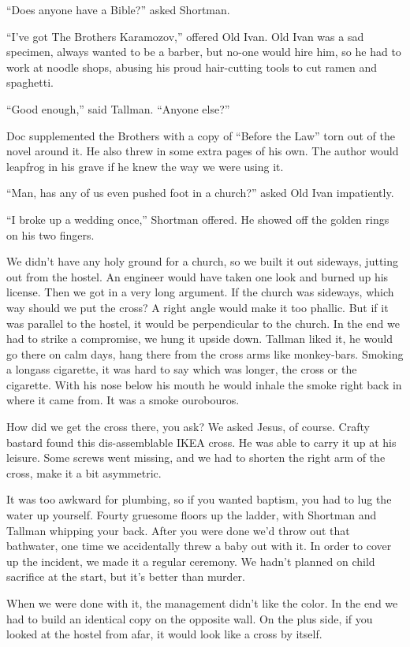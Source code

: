 \documentclass[oneside]{book}
\begin{document}
``Does anyone have a Bible?''
asked Shortman.

``I've got The Brothers Karamozov,'' offered Old Ivan.  Old Ivan was a sad specimen,
always wanted to be a barber, but no-one would hire him, so he had to work at noodle shops, abusing his
proud hair-cutting tools to cut ramen and spaghetti.

``Good enough,'' said Tallman.  ``Anyone else?''

Doc supplemented the Brothers with a copy of ``Before the Law'' torn out of the novel around it.  He also threw in some extra
pages of his own.  The author would leapfrog in his grave if he knew the way we were using it.

``Man, has any of us even pushed foot in a church?'' asked Old Ivan impatiently.

``I broke up a wedding once,'' Shortman offered.  He showed off the golden rings on his two fingers.

We didn't have any holy ground for a church, so we built it out sideways, jutting out from the hostel.
An engineer would have taken one look and burned up his license.
Then we got in a very long argument.  If the church was sideways, which way should we put the cross?
A right angle would make it too phallic.  But if it was parallel to the hostel, it would be perpendicular
to the church.  In the end we had to strike a compromise, we hung it upside down.
Tallman liked it, he would go there on calm days, hang there from the cross arms like monkey-bars.
Smoking a longass cigarette, it was hard to say which was longer, the cross or the cigarette.
With his nose below his mouth he would inhale the smoke right back in where it came from.
It was a smoke ourobouros.

How did we get the cross there, you ask?  We asked Jesus, of course.  Crafty bastard found this dis-assemblable
IKEA cross.  He was able to carry it up at his leisure.  Some screws went missing, and we had to shorten the
right arm of the cross, make it a bit asymmetric.

It was too awkward for plumbing, so if you wanted baptism, you had to lug the water up yourself.
Fourty gruesome floors up the ladder, with Shortman and Tallman whipping your back.  After you were done we'd throw
out that bathwater, one time we accidentally threw a baby out with it.  In order to cover up the incident,
we made it a regular ceremony.  We hadn't planned on child sacrifice at the start, but it's better
than murder.

When we were done with it, the management didn't like the color.  In the end we had to build an identical
copy on the opposite wall.  On the plus side, if you looked at the hostel from afar, it would look
like a cross by itself.
\end{document}
